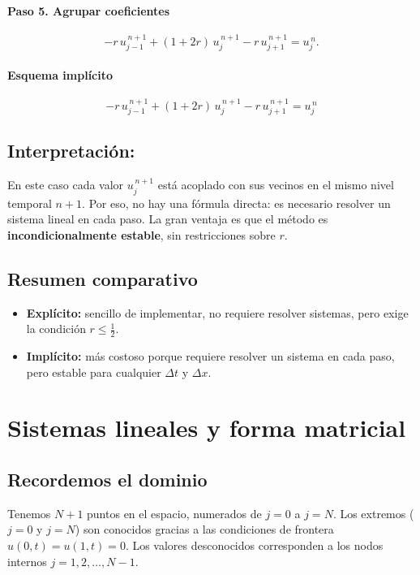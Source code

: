 \documentclass[12pt,a4paper]{article}
\begin{document}
\paragraph{Paso 5. Agrupar coeficientes}  
\[
-r\,u_{j-1}^{\,n+1} + (1+2r)\,u_j^{\,n+1} - r\,u_{j+1}^{\,n+1} = u_j^{\,n}.
\]

\paragraph{Esquema implícito}  
\[
\boxed{-r\,u_{j-1}^{\,n+1} + (1+2r)\,u_j^{\,n+1} - r\,u_{j+1}^{\,n+1} = u_j^{\,n}}
\]

\subsection*{Interpretación:} 
En este caso cada valor $u_j^{\,n+1}$ está acoplado con sus vecinos en el mismo nivel temporal $n+1$.  
Por eso, no hay una fórmula directa: es necesario resolver un sistema lineal en cada paso.  
La gran ventaja es que el método es \textbf{incondicionalmente estable}, sin restricciones sobre $r$.

\subsection{Resumen comparativo}

\begin{itemize}
    \item \textbf{Explícito:} sencillo de implementar, no requiere resolver sistemas, pero exige la condición $r \leq \tfrac{1}{2}$.
    \item \textbf{Implícito:} más costoso porque requiere resolver un sistema en cada paso, pero estable para cualquier $\Delta t$ y $\Delta x$.
\end{itemize}

\section{Sistemas lineales y forma matricial}

\subsection{Recordemos el dominio}

Tenemos \(N+1\) puntos en el espacio, numerados de \(j=0\) a \(j=N\).  
Los extremos (\(j=0\) y \(j=N\)) son conocidos gracias a las condiciones de frontera \(u(0,t)=u(1,t)=0\). Los valores desconocidos corresponden a los nodos internos \(j=1,2,\dots,N-1\).  
\end{document}
